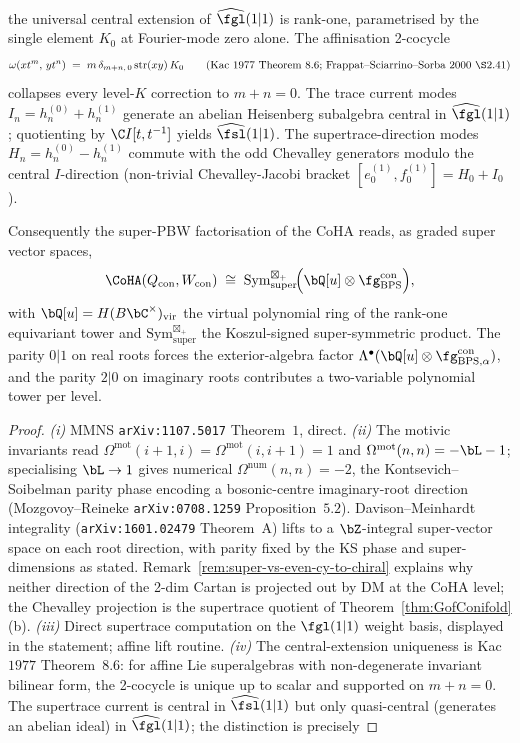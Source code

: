 \begin{proposition}
\begin{enumerate}[label=\textup{(\roman*)}]
 the universal central extension of $\widehat{\fgl}(1|1)$ is
 rank-one, parametrised by the single element $K_0$ at Fourier-mode
 zero alone. The affinisation 2-cocycle
 \[
 \omega(x t^m,\, y t^n) \;=\; m\,\delta_{m+n,\,0}\,\mathrm{str}(xy)\,K_0
 \qquad
 \text{\textup{(}Kac $1977$ Theorem~$8.6$; Frappat--Sciarrino--Sorba $2000$
 \S$2.41$\textup{)}}
 \]
 collapses every level-$K$ correction to $m + n = 0$. The trace
 current modes $I_n = h^{(0)}_n + h^{(1)}_n$ generate an abelian
 Heisenberg subalgebra central in $\widehat{\fgl}(1|1)$; quotienting
 by $\C I[t, t^{-1}]$ yields $\widehat{\fsl}(1|1)$. The
 supertrace-direction modes $H_n = h^{(0)}_n - h^{(1)}_n$ commute
 with the odd Chevalley generators modulo the central $I$-direction
 \textup{(}non-trivial Chevalley-Jacobi bracket
 $[e^{(1)}_0, f^{(1)}_0] = H_0 + I_0$\textup{).}
\end{enumerate}
Consequently the super-PBW factorisation of the CoHA reads, as graded
super vector spaces,
\[
 \CoHA(Q_{\mathrm{con}}, W_{\mathrm{con}})
 \;\cong\;
 \mathrm{Sym}^{\boxtimes_+}_{\mathrm{super}}\!\Bigl(
 \bQ[u] \otimes \fg_{\mathrm{BPS}}^{\mathrm{con}}
 \Bigr),
\]
with $\bQ[u] = H(B\bC^\times)_{\mathrm{vir}}$ the virtual polynomial
ring of the rank-one equivariant tower and
$\mathrm{Sym}^{\boxtimes_+}_{\mathrm{super}}$ the Koszul-signed
super-symmetric product. The parity $0|1$ on real roots forces the
exterior-algebra factor $\Lambda^\bullet(\bQ[u] \otimes
\fg_{\mathrm{BPS},\alpha}^{\mathrm{con}})$, and the parity $2|0$ on
imaginary roots contributes a two-variable polynomial tower per level.
\end{proposition}

\begin{proof}
\emph{(i)} MMNS \texttt{arXiv:1107.5017} Theorem~$1$, direct.
\emph{(ii)} The motivic invariants read
$\Omega^{\mathrm{mot}}(i{+}1, i) = \Omega^{\mathrm{mot}}(i, i{+}1) = 1$
and $\Omega^{\mathrm{mot}}(n, n) = -\bL - 1$; specialising $\bL \to 1$
gives numerical $\Omega^{\mathrm{num}}(n, n) = -2$, the Kontsevich--Soibelman
parity phase encoding a bosonic-centre imaginary-root direction
(Mozgovoy--Reineke \texttt{arXiv:0708.1259} Proposition~$5.2$).
Davison--Meinhardt integrality (\texttt{arXiv:1601.02479} Theorem~A)
lifts to a $\bZ$-integral super-vector space on each root direction,
with parity fixed by the KS phase and super-dimensions as stated.
Remark~\textup{\ref{rem:super-vs-even-cy-to-chiral}} explains why
neither direction of the 2-dim Cartan is projected out by DM at the
CoHA level; the Chevalley projection is the supertrace quotient of
Theorem~\textup{\ref{thm:GofConifold}(b)}.
\emph{(iii)} Direct supertrace computation on the $\fgl(1|1)$ weight
basis, displayed in the statement; affine lift routine.
\emph{(iv)} The central-extension uniqueness is Kac $1977$ Theorem~$8.6$:
for affine Lie superalgebras with non-degenerate invariant bilinear
form, the 2-cocycle is unique up to scalar and supported on $m + n = 0$.
The supertrace current is central in $\widehat{\fsl}(1|1)$ but only
quasi-central (generates an abelian ideal) in $\widehat{\fgl}(1|1)$;
the distinction is precisely
\end{proof}

